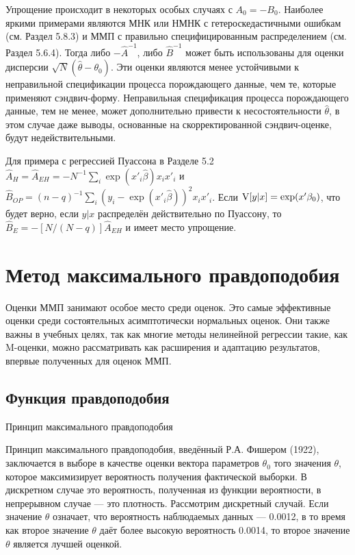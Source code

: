 Упрощение происходит в некоторых особых случаях с $A_0=-B_0$. Наиболее яркими примерами являются МНК или НМНК с гетероскедастичными ошибкам (см. Раздел 5.8.3) и ММП с правильно специфицированным распределением (см. Раздел 5.6.4). Тогда либо $-\hat{A}^{-1}$, либо
$\hat{B}^{-1}$ может быть использованы для оценки дисперсии $\sqrt{N}(\hat{\theta} - \theta_0)$. Эти оценки являются менее устойчивыми к неправильной спецификации процесса порождающего данные, чем те, которые применяют сэндвич-форму. Неправильная спецификация процесса порождающего данные, тем не менее, может дополнительно привести к несостоятельности $\hat{\theta}$, в этом случае даже выводы, основанные на скорректированной сэндвич-оценке, будут недействительными.

Для примера с регрессией Пуассона в Разделе 5.2 $\hat{A}_H = \hat{A}_{EH}=-N^{-1} \sum_i \exp(x'_i \hat{\beta})x_i x'_i$ и  $\hat{B}_{OP}=(n-q)^{-1} \sum_i (y_i-\exp(x'_i \hat{\beta}))^{2} x_i x'_i$. Если $\mathrm{V}[y|x]=\exp(x' \beta_0)$, что будет верно, если $y|x$ распределён действительно по Пуассону, то $\hat{B}_{E}=-[N/(N-q)] \hat{A}_{EH}$ и имеет место упрощение.

\section{Метод максимального правдоподобия}

Оценки ММП занимают особое место среди оценок. Это самые эффективные оценки среди состоятельных асимптотически нормальных оценок. Они также важны в учебных целях, так как многие методы нелинейной регрессии такие, как M-оценки, можно рассматривать как расширения и адаптацию результатов, впервые полученных для оценок ММП.

\subsection{Функция правдоподобия}

\begin{center}
Принцип максимального правдоподобия
\end{center}

Принцип максимального правдоподобия, введённый Р.А. Фишером (1922), заключается в выборе в качестве оценки вектора параметров $\theta_0$ того значения $\theta$, которое максимизирует вероятность получения фактической выборки. В дискретном случае это вероятность, полученная из функции вероятности, в непрерывном случае --- это плотность. Рассмотрим дискретный случай. Если значение $\theta$ означает, что вероятность наблюдаемых данных --- 0.0012, в то время как второе значение $\theta$ даёт более высокую вероятность 0.0014, то второе значение $\theta$ является лучшей оценкой.

